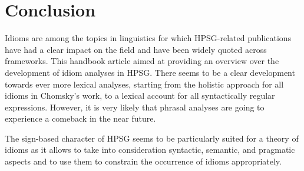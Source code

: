 \documentclass[output=paper]{langsci/langscibook}
\begin{document}



\section{Conclusion}
\label{Sec-Summary}

Idioms are among the topics in linguistics for which HPSG-related publications have had a clear impact on the field and have been widely quoted across frameworks.
This handbook article aimed at providing an overview over the development of idiom analyses in HPSG. There seems to be a clear development towards ever more lexical analyses, starting from the holistic approach for all idioms in Chomsky's work, to a lexical account for all syntactically regular expressions. 
However, it is very likely that phrasal analyses are going to experience a comeback in the near future. 

The sign-based character of HPSG seems to be particularly suited for a theory of idioms as it allows to take into consideration syntactic, semantic, and pragmatic aspects and to use them to constrain the occurrence of idioms appropriately.
\end{document}
